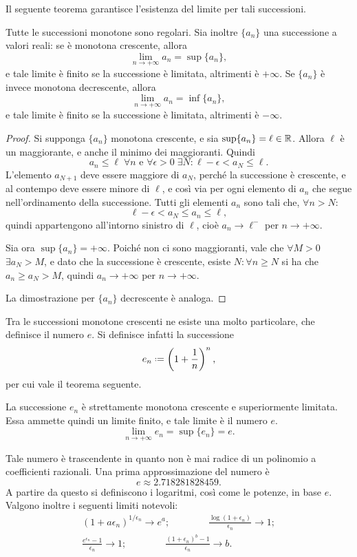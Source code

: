 Il seguente teorema garantisce l'esistenza del limite per tali successioni.
\begin{teorema}
Tutte le successioni monotone sono regolari. Sia inoltre $\{a_n\}$ una successione a valori reali: se è monotona crescente, allora
\[
\lim_{n\to +\infty} a_n=\sup\{a_n\},
\]
e tale limite è finito se la successione è limitata, altrimenti è $+\infty$.
Se $\{a_n\}$ è invece monotona decrescente, allora
\[
\lim_{n\to +\infty} a_n=\inf\{a_n\},
\]
e tale limite è finito se la successione è limitata, altrimenti è $-\infty$.
\end{teorema}
\begin{proof}
Si supponga $\{a_n\}$ monotona crescente, e sia $\sup\{a_n\}=\ell\in\mathbb{R}$. Allora $\ell$ è un maggiorante, e anche il minimo dei maggioranti. Quindi
\[
a_n\leq\ell\;\forall n\text{ e }\forall\epsilon>0\;\exists N\colon\ell-\epsilon<a_N\leq\ell.
\]
L'elemento $a_{N+1}$ deve essere maggiore di $a_N$, perché la successione è crescente, e al contempo deve essere minore di $\ell$, e così via per ogni elemento di $a_n$ che segue nell'ordinamento della successione. Tutti gli elementi $a_n$ sono tali che, $\forall n>N$:
\[
\ell-\epsilon<a_N\leq a_n\leq\ell,
\]
quindi appartengono all'intorno sinistro di $\ell$, cioè $a_n\to\ell^-$ per $n\to +\infty$.

Sia ora $\sup\{a_n\}=+\infty$. Poiché non ci sono maggioranti, vale che $\forall M>0$ $\exists a_N>M$, e dato che la successione è crescente, esiste $N\colon\forall n\geq N$ si ha che $a_n\geq a_N>M$, quindi $a_n\to +\infty$ per $n\to +\infty$.

La dimostrazione per $\{a_n\}$ decrescente è analoga.
\end{proof}
Tra le successioni monotone crescenti ne esiste una molto particolare, che definisce il numero $e$. Si definisce infatti la successione
\[
e_n\defeq\left(1+\frac1{n}\right)^n,
\]
per cui vale il teorema seguente.
\begin{teorema}
La successione $e_n$ è strettamente monotona crescente e superiormente limitata. Essa ammette quindi un limite finito, e tale limite è il numero $e$.
\[
\lim_{n\to +\infty} e_n=\sup\{e_n\}=e.
\]
\end{teorema}
Tale numero è trascendente in quanto non è mai radice di un polinomio a coefficienti razionali. Una prima approssimazione del numero è
\[
e\approx\num{2.718281828459}.
\]
A partire da questo si definiscono i logaritmi, così come le potenze, in base $e$. Valgono inoltre i seguenti limiti notevoli:
\begin{gather*}
(1+a\epsilon_n)^{1/\epsilon_n}\to e^a;\qquad\qquad\frac{\log(1+\epsilon_n)}{\epsilon_n}\to 1;\\
\frac{e^{\epsilon_n}-1}{\epsilon_n}\to 1;\qquad\qquad\frac{(1+\epsilon_n)^b-1}{\epsilon_n}\to b.
\end{gather*}
